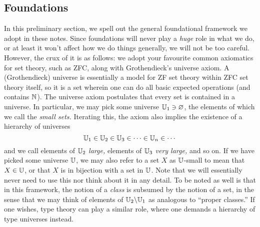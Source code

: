 \documentclass[a4paper, 11pt]{article}
\newcommand{\1}{\ensuremath{\mathbb{1}}}
\newcommand{\2}{\ensuremath{\mathbb{2}}}
\newcommand{\3}{\ensuremath{\mathbb{3}}}
\begin{document}
\subsection{Foundations}
In this preliminary section, we spell out the general foundational framework we adopt in these notes. Since foundations will never play a \emph{huge} role in what we do, or at least
it won't affect how we do things generally, we will not be too careful. However, the crux of it is as follows: we adopt your favourite common axiomatics for set theory, such as ZFC, along with
Grothendieck's universe axiom. A (Grothendieck) universe is essentially a model for ZF set theory within ZFC set theory itself, so it is a set wherein one can do all basic expected operations (and contains \(\mathbb{N}\)).
The universe axiom postulates that every set is contained in a universe. In particular, we may pick some universe \(\mathbb{U}_1\ni\varnothing\), the elements of which we call the \emph{small sets.} Iterating this, the axiom
also implies the existence of a hierarchy of universes
\[ \mathbb{U}_1 \in \mathbb{U}_2 \in \mathbb{U}_3\in \cdots \in \mathbb{U}_n\in\cdots \]
and we call elements of \(\mathbb{U}_2\) \emph{large,} elements of \(\mathbb{U}_3\) \emph{very large,} and so on. If we have picked some universe \(\mathbb{U}\), we may also refer to a set \(X\) as \(\mathbb{U}\)-small to mean that \(X\in\mathbb{U}\), or
that \(X\) is in bijection with a set in \(\mathbb{U}\). Note that we will essentially never need to use this nor think about it in any detail. To be noted as well is that in this framework, the notion of a \emph{class} is subsumed
by the notion of a set, in the sense that we may think of elements of \(\mathbb{U}_2\backslash\mathbb{U}_1\) as analogous to ``proper classes.'' If one wishes, type theory can play a similar role, where one demands a hierarchy of type universes instead.
\end{document}
